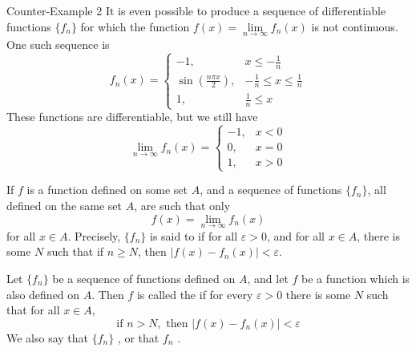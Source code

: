 \documentclass[12pt]{report}
\begin{document}
\begin{eg*}{Counter-Example 2}{}
    It is even possible to produce a sequence of differentiable functions $\{f_n\}$ for which the function $f(x) = \lim\limits_{n\rightarrow \infty}f_n(x)$ is not continuous. One such sequence is \begin{equation*}
        f_n(x) = \left\{\begin{array}{lc} -1, &  x \leq -\frac{1}{n} \\ \sin\left(\frac{n\pi x}{2}\right), & -\frac{1}{n} \leq x \leq \frac{1}{n} \\ 1, & \frac{1}{n} \leq x \end{array}\right.
    \end{equation*}
    These functions are differentiable, but we still have  \begin{equation*}
        \lim\limits_{n\rightarrow \infty}f_n(x) = \left\{\begin{array}{lc} -1, & x < 0 \\ 0, & x = 0 \\ 1, & x > 0 \end{array}\right.
    \end{equation*}
\end{eg*}

\begin{defn}{}{}
    If $f$ is a function defined on some set $A$, and a sequence of functions $\{f_n\}$, all defined on the same set $A$, are such that only \begin{equation*}
        f(x) = \lim\limits_{n\rightarrow \infty}f_n(x)
    \end{equation*}
    for all $x \in A$. Precisely, $\{f_n\}$ is said to  if for all $\varepsilon > 0$, and for all $x \in A$, there is some $N$ such that if $n \geq N$, then $|f(x) - f_n(x)| < \varepsilon$.
\end{defn}


\begin{defn}{}{}
    Let $\{f_n\}$ be a sequence of functions defined on $A$, and let $f$ be a function which is also defined on $A$. Then $f$ is called the  if for every $\varepsilon > 0$ there is some $N$ such that for all $x \in A$, \begin{equation*}
        \text{if } n> N, \text{ then } |f(x) - f_n(x)| < \varepsilon
    \end{equation*}
    We also say that $\{f_n\}$ , or that $f_n$ .
\end{defn}
\end{document}
